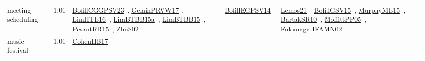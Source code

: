 {\begin{longtable}{p{3cm}r>{\raggedright\arraybackslash}p{6cm}>{\raggedright\arraybackslash}p{6cm}>{\raggedright\arraybackslash}p{8cm}}
\index{meeting scheduling}\index{ApplicationAreas!meeting scheduling}meeting scheduling &  1.00 & \href{../works/BofillCGGPSV23.pdf}{BofillCGGPSV23}~\cite{BofillCGGPSV23}, \href{../works/GelainPRVW17.pdf}{GelainPRVW17}~\cite{GelainPRVW17}, \href{../works/LimHTB16.pdf}{LimHTB16}~\cite{LimHTB16}, \href{../works/LimBTBB15a.pdf}{LimBTBB15a}~\cite{LimBTBB15a}, \href{../works/LimBTBB15.pdf}{LimBTBB15}~\cite{LimBTBB15}, \href{../works/PesantRR15.pdf}{PesantRR15}~\cite{PesantRR15}, \href{../works/ZhuS02.pdf}{ZhuS02}~\cite{ZhuS02} & \href{../works/BofillEGPSV14.pdf}{BofillEGPSV14}~\cite{BofillEGPSV14} & \href{../works/Lemos21.pdf}{Lemos21}~\cite{Lemos21}, \href{../works/BofillGSV15.pdf}{BofillGSV15}~\cite{BofillGSV15}, \href{../works/MurphyMB15.pdf}{MurphyMB15}~\cite{MurphyMB15}, \href{../works/BartakSR10.pdf}{BartakSR10}~\cite{BartakSR10}, \href{../works/MoffittPP05.pdf}{MoffittPP05}~\cite{MoffittPP05}, \href{../works/FukunagaHFAMN02.pdf}{FukunagaHFAMN02}~\cite{FukunagaHFAMN02}\\
\index{music festival}\index{ApplicationAreas!music festival}music festival &  1.00 & \href{../works/CohenHB17.pdf}{CohenHB17}~\cite{CohenHB17} &  & \\

\end{longtable}}
